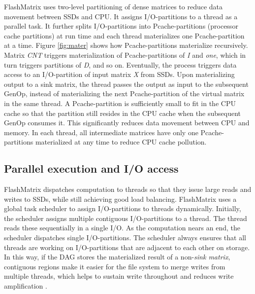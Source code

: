 FlashMatrix uses two-level partitioning of dense matrices
to reduce data movement between SSDs and CPU. It assigns I/O-partitions
to a thread as a parallel task.
It further splits I/O-partitions into Pcache-partitions (processor cache
partitions) at run time and each thread materializes one Pcache-partition
at a time. 
Figure \ref{fig:mater} shows how Pcache-partitions
materialize recursively. Matrix \textit{CNT} triggers materialization of
Pcache-partitions of \textit{I} and \textit{one}, which in turn triggers 
partitions of \textit{D}, and so on. Eventually, the process triggers data access
to an I/O-partition of input matrix \textit{X} from SSDs. Upon materializing
output to a sink matrix, the thread passes the output as input to the subsequent
GenOp, instead of materializing the next Pcache-partition of the virtual matrix
in the same thread.
A Pcache-partition is sufficiently small to fit in the CPU cache so that
the partition still resides in the CPU cache when the subsequent GenOp consumes
it. This significantly reduces data movement between CPU and memory. In each
thread, all intermediate matrices have only one Pcache-partitions materialized
at any time to reduce CPU cache pollution.



\vspace{-8pt}
\subsection{Parallel execution and I/O access}
\vspace{-4pt}
FlashMatrix dispatches computation to threads so that they
issue large reads and writes to SSDs, while still achieving good load balancing.
FlashMatrix uses a global task scheduler to assign 
I/O-partitions to threads dynamically. Initially,
the scheduler assigns multiple contiguous I/O-partitions to a thread.
The thread reads these sequentially in a single I/O.
As the computation nears an end, the scheduler dispatches single I/O-partitions. 
The scheduler always ensures that all threads are working on I/O-partitions that are adjacent to
each other on storage.
In this way, if the DAG stores the materialized result of a non-\textit{sink matrix}, 
contiguous regions make it easier for the file system to merge
writes from multiple threads, which helps to sustain write throughout and reduces
write amplification \cite{ripq}.

